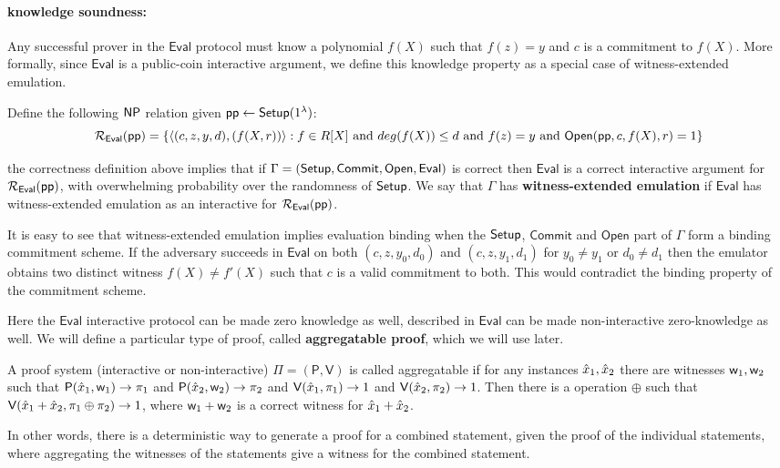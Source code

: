 \documentclass[runningheads]{llncs}
\def\commit{\mathsf{Commit}}
\def\open{\mathsf{Open}}
\def\eval{\mathsf{Eval}}
\def\pp{\mathsf{pp}}
\def\prover{\mathsf{P}}
\def\verifier{\mathsf{V}}
\begin{document}
\paragraph{\textbf{knowledge soundness: }} Any successful prover in the $\eval$ protocol must know a polynomial $f(X)$ such that $f(z)=y$ and $c$ is a commitment to $f(X)$. More formally, since $\eval$ is a public-coin interactive argument, we define this knowledge property as a special case of witness-extended emulation.

Define the following $\mathsf{NP}$ relation given $\pp\leftarrow \setup(\secparam)$:
$$\calR_{\eval}(\pp)=\{\innp{(c,z,y,d)}{(f(X,r))}: f\in R[X] \text{ and } deg(f(X))\leq d
\text{ and } f(z)=y \text{ and }\open(\pp,c,f(X),r) =1 \}$$

the correctness definition above implies that if $\Gamma = (\setup, \commit, \open, \eval)$ is correct then $\eval$ is a correct interactive argument for $\calR_{\eval}(\pp)$, with overwhelming probability over the randomness of $\mathsf{Setup}$. We say that $\Gamma$ has \textbf{witness-extended emulation} if $\eval$ has witness-extended emulation as an interactive for $\calR_{\eval}(\pp)$.

It is easy to see that witness-extended emulation implies evaluation binding when the $\mathsf{Setup}$, $\commit$ and $\open$ part of $\Gamma$ form a binding commitment scheme. If the adversary succeeds in $\eval$ on both $(c,z, y_0,d_0)$ and $(c,z,y_1,d_1)$ for $y_0\neq y_1$ or $d_0\neq d_1$ then the emulator obtains two distinct witness $f(X)\neq f'(X)$ such that $c$ is a valid commitment to both. This would contradict the binding property of the commitment scheme.

Here the $\eval$ interactive protocol can be made zero knowledge as well, described in \cite{DARK19}
$\eval$ can be made non-interactive zero-knowledge as well.
We will define a particular type of proof, called \textbf{aggregatable proof}, which we will use later.

\begin{definition}\label{defn:aggregatable}
	A proof system (interactive or non-interactive) $\Pi=(\prover, \verifier)$ is called aggregatable if for any instances $\hat{x}_1, \hat{x}_2$ there are witnesses $\mathsf{w}_1, \mathsf{w}_2$ such that $\prover(\stmt_1,\wit_1) \rightarrow \pi_1$ and $\prover(\stmt_2, \wit_2) \rightarrow \pi_2$ and $\verifier(\stmt_1,\pi_1) \rightarrow 1$ and $\verifier(\stmt_2,\pi_2) \rightarrow 1$. Then there is a operation $\oplus$ such that $\verifier(\stmt_1+\stmt_2, \pi_1 \oplus \pi_2) \rightarrow 1$, where $\mathsf{w}_1 + \mathsf{w}_2$ is a correct witness for $\hat{x}_1+\hat{x}_2$.
\end{definition}
In other words, there is a deterministic way to generate a proof for a combined statement, given the proof of the individual statements, where aggregating the witnesses of the statements give a witness for the combined statement.
\end{document}
